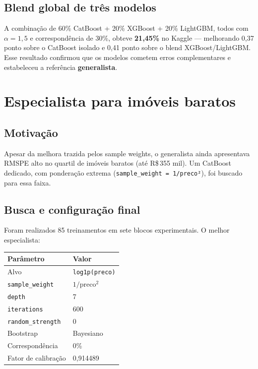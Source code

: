 \documentclass[12pt,a4paper]{article}
\begin{document}
\subsection{Blend global de três modelos}

A combinação de 60\% CatBoost + 20\% XGBoost + 20\% LightGBM, todos com $\alpha=1{,}5$ e correspondência de 30\%, obteve \textbf{21,45\%} no Kaggle --- melhorando 0,37 ponto sobre o CatBoost isolado e 0,41 ponto sobre o blend XGBoost/LightGBM. Esse resultado confirmou que os modelos cometem erros complementares e estabeleceu a referência \textbf{generalista}.

\section{Especialista para imóveis baratos}

\subsection{Motivação}

Apesar da melhora trazida pelos sample weights, o generalista ainda apresentava RMSPE alto no quartil de imóveis baratos (até R\$\,355 mil). Um CatBoost dedicado, com ponderação extrema (\lstinline{sample_weight = 1/preco²}), foi buscado para essa faixa.

\subsection{Busca e configuração final}

Foram realizados 85 treinamentos em sete blocos experimentais. O melhor especialista:

\begin{table}[h]
\centering
\begin{tabular}{ll}
\toprule
\textbf{Parâmetro} & \textbf{Valor} \\
\midrule
Alvo                  & \lstinline{log1p(preco)} \\
\texttt{sample\_weight} & $1 / \text{preco}^2$ \\
\texttt{depth}         & 7 \\
\texttt{iterations}    & 600 \\
\texttt{random\_strength} & 0 \\
Bootstrap              & Bayesiano \\
Correspondência        & 0\% \\
Fator de calibração    & 0,914489 \\
\bottomrule
\end{tabular}
\end{table}
\end{document}
